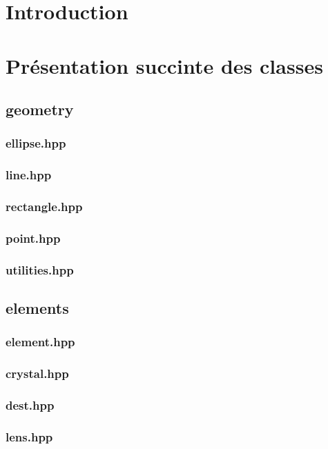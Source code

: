 \documentclass[a4paper,11pt]{report}
\begin{document}

\tableofcontents

\chapter{Introduction}


\chapter[Les classes]{Présentation succinte des classes}
\section[Les objets géométriques]{geometry}
\subsection[Ellipse]{ellipse.hpp}
\subsection[Droite]{line.hpp}
\subsection[Rectangle]{rectangle.hpp}
\subsection[Point]{point.hpp}
\subsection[Utilitaire]{utilities.hpp}
\section[Les éléments]{elements}
\subsection[Element]{element.hpp}
\subsection[Cristal]{crystal.hpp}
\subsection[Destination]{dest.hpp}
\subsection[Lentille]{lens.hpp}
\end{document}
